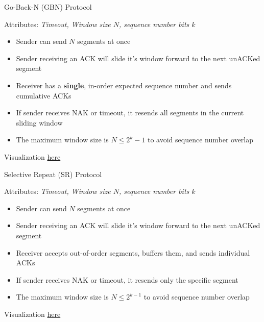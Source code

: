\begin{theorem}
    {Go-Back-N (GBN) Protocol}

    Attributes: \textit{Timeout, Window size $N$, sequence number bits $k$}

    \begin{itemize}
        \item Sender can send $N$ segments at once
        \item Sender receiving an ACK will slide it's window forward to the next unACKed segment
        \item Receiver has a \textbf{single}, in-order expected sequence number and sends cumulative ACKs
        \item If sender receives NAK or timeout, it resends all segments in the current sliding window
        \item The maximum window size is $N \leq 2^k - 1$ to avoid sequence number overlap
    \end{itemize}

    Visualization \href{https://media.pearsoncmg.com/aw/ecs_kurose_compnetwork_7/cw/content/interactiveanimations/go-back-n-protocol/index.html}{here}
\end{theorem}


\begin{theorem}
    {Selective Repeat (SR) Protocol}

    Attributes: \textit{Timeout, Window size $N$, sequence number bits $k$}

    \begin{itemize}
        \item Sender can send $N$ segments at once
        \item Sender receiving an ACK will slide it's window forward to the next unACKed segment
        \item Receiver accepts out-of-order segments, buffers them, and sends individual ACKs
        \item If sender receives NAK or timeout, it resends only the specific segment
        \item The maximum window size is $N \leq 2^{k-1}$ to avoid sequence number overlap
    \end{itemize}

    Visualization \href{https://media.pearsoncmg.com/aw/ecs_kurose_compnetwork_7/cw/content/interactiveanimations/selective-repeat-protocol/index.html}{here}
\end{theorem}